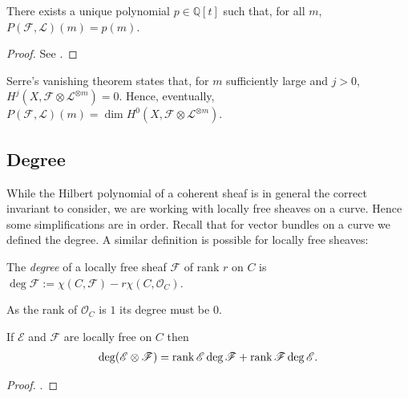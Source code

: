 \documentclass[12pt]{ociamthesis}  %
\begin{document}
\begin{lemma}
  There exists a unique polynomial $p\in\mathbb{Q}[t]$ such that,
  for all $m$, $P(\mathscr F,\mathscr L)(m) = p(m)$.
  \begin{proof}
    See \cite[Lemma 1.2.1]{huybrechts2010}.
  \end{proof}
\end{lemma}

\begin{example}
  \missingexample
\end{example}

Serre's vanishing theorem \missingcitation states that,
for $m$ sufficiently large and $j>0$,
$H^j(X,\mathscr F\otimes\mathscr L^{\otimes m})=0$. Hence,
eventually,
$P(\mathscr F,\mathscr L)(m) = \dim H^0(X,\mathscr F\otimes \mathscr L^{\otimes m})$.

\begin{lemma}
\end{lemma}

\subsection{Degree}

While the Hilbert polynomial of a coherent sheaf is in general the
correct invariant to consider, we are working with locally free
sheaves on a curve. Hence some simplifications are in order.
Recall that for vector bundles on a curve we defined the degree.
A similar definition is possible for locally free sheaves:

\begin{definition}
  The \emph{degree} of a locally free sheaf $\mathscr F$ of rank $r$
  on $C$ is $\deg \mathscr F := \chi (C,\mathscr F) - r\chi(C,\mathscr O_C)$.
\end{definition}

\begin{example}
  As the rank of $\mathscr O_C$ is $1$ its degree must be $0$.
\end{example}

\begin{lemma}\label{lem:degree_of_tensor}
  If $\mathscr E$ and $\mathscr F$ are locally free on $C$ then
  \begin{align*}
    \deg(\mathscr E\otimes\mathscr F) = \operatorname{rank}\mathscr E\deg\mathscr F + \operatorname{rank}\mathscr F\deg\mathscr E.
  \end{align*}
  \begin{proof}
    \cite[Exercise 8.24]{hoskins2016}.
    \missingproof
  \end{proof}
\end{lemma}
\end{document}
